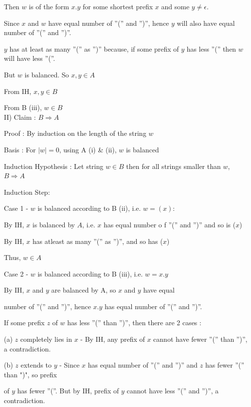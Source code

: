 \documentclass{article}
\begin{document}
    \qquad Then $w$ is of the form $x.y$ for some shortest prefix $x$ and some $y \neq \epsilon$.
    
    \qquad Since $x$ and $w$ have equal number of ”(” and ”)”, hence $y$ will also have equal number of ”(” and ”)”.
    
    \qquad $y$ has at least as many ”(” as ”)” because, if some prefix of $y$ has less ”(” then $w$ will have less ”(”.
    
    \qquad But $w$ is balanced. So $x, y \in A$
    
    \qquad From IH, $x, y \in B$
    
    \qquad From B (iii), $w \in B$\\


II) Claim : $B \Longrightarrow A$
    
    Proof : By induction on the length of the string $w$
    
    Basis : For $|w| = 0$, using A (i) \& (ii), $w$ is balanced
    
    Induction Hypothesis : Let string $w \in B$ then for all strings smaller than $w$, $B \Longrightarrow A$
    
    Induction Step:
    
    \quad Case 1 - $w$ is balanced according to B (ii), i.e. $w = (x)$: 
    
    \qquad By IH, $x$ is balanced by $A$, i.e. $x$ has equal number o f ”(” and ”)” and so is ($x$)
    
    \qquad By IH, $x$ has atleast as many ”(” as ”)”, and so has ($x$)
    
    \qquad Thus, $w \in A$
    
    \quad Case 2 - $w$ is balanced according to B (iii), i.e. $w = x.y$
    
    \qquad By IH, $x$ and $y$ are balanced by A, so $x$ and $y$ have equal 
    
    \qquad number of ”(” and ”)”, hence $x.y$ has equal number of ”(” and ”)”.
    
    \qquad If some prefix $z$ of $w$ has less ”(” than ”)”, then there are 2 cases :
    
    \quad \qquad (a) $z$ completely lies in $x$ - By IH, any prefix of $x$ cannot have fewer ”(” than ”)”, a contradiction.

    \quad \qquad (b) $z$ extends to $y$ -  Since $x$ has equal number of ”(” and ”)” and $z$ has fewer ”(” than ")", so prefix 
    
    \quad \qquad of $y$ has fewer ”(”. But by IH, prefix of $y$ cannot have less ”(” and ”)”, a contradiction.
    
\end{document}
